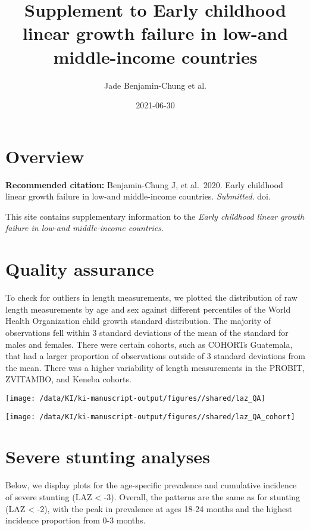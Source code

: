 \documentclass[
  9pt,
]{book}
\title{Supplement to Early childhood linear growth failure in low-and middle-income countries}
\author{Jade Benjamin-Chung et al.}
\date{2021-06-30}
\begin{document}
\maketitle

{
\setcounter{tocdepth}{1}
\tableofcontents
}
\hypertarget{overview}{%
\chapter{Overview}\label{overview}}

\textbf{Recommended citation:} Benjamin-Chung J, et al.~2020. Early childhood linear growth failure in low-and middle-income countries. \emph{Submitted}. doi.

This site contains supplementary information to the \emph{Early childhood linear growth failure in low-and middle-income countries}.

\hypertarget{QA}{%
\chapter{Quality assurance}\label{QA}}

\raggedright

To check for outliers in length measurements, we plotted the distribution of raw length measurements by age and sex against different percentiles of the World Health Organization child growth standard distribution. The majority of observations fell within 3 standard deviations of the mean of the standard for males and females. There were certain cohorts, such as COHORTs Guatemala, that had a larger proportion of observations outside of 3 standard deviations from the mean. There was a higher variability of length measurements in the PROBIT, ZVITAMBO, and Keneba cohorts.

\texttt{[image: /data/KI/ki-manuscript-output/figures//shared/laz\_QA]}

\texttt{[image: /data/KI/ki-manuscript-output/figures//shared/laz\_QA\_cohort]}

\hypertarget{severe-stunting}{%
\chapter{Severe stunting analyses}\label{severe-stunting}}

\raggedright

Below, we display plots for the age-specific prevalence and cumulative incidence of severe stunting (LAZ \textless{} -3). Overall, the patterns are the same as for stunting (LAZ \textless{} -2), with the peak in prevalence at ages 18-24 months and the highest incidence proportion from 0-3 months.
\end{document}
